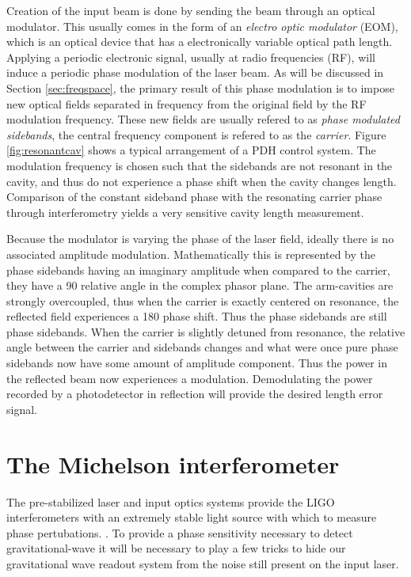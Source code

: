 Creation of the input beam is done by sending the beam through an optical modulator. %
This usually comes in the form of an \emph{electro optic modulator} (EOM), which is an optical device that has a electronically variable optical path length. %
Applying a periodic electronic signal, usually at radio frequencies (RF), will induce a periodic phase modulation of the laser beam. %
As will be discussed in Section \ref{sec:freqspace}, the primary result of this phase modulation is to impose new optical fields separated in frequency from the original field by the RF modulation frequency. %
These new fields are usually refered to as \emph{phase modulated sidebands}, the central frequency component is refered to as the \emph{carrier}. %
Figure \ref{fig:resonantcav} shows a typical arrangement of a PDH control system. %
The modulation frequency is chosen such that the sidebands are not resonant in the cavity, and thus do not experience a phase shift when the cavity changes length. %
Comparison of the constant sideband phase with the resonating carrier phase through interferometry yields a very sensitive cavity length measurement. %


Because the modulator is varying the phase of the laser field, ideally there is no associated amplitude modulation. %
Mathematically this is represented by the phase sidebands having an imaginary amplitude when compared to the carrier, they have a 90\degrees{} relative angle in the complex phasor plane. %
The arm-cavities are strongly overcoupled, thus when the carrier is exactly centered on resonance, the reflected field experiences a 180\degrees{} phase shift. %
Thus the phase sidebands are still phase sidebands. %
When the carrier is slightly detuned from resonance, the relative angle between the carrier and sidebands changes and what were once pure phase sidebands now have some amount of amplitude component. %
Thus the power in the reflected beam now experiences a modulation. %
Demodulating the power recorded by a photodetector in reflection will provide the desired length error signal.

\section{The Michelson interferometer}
The pre-stabilized laser and input optics systems provide the LIGO interferometers with an extremely stable light source with which to measure phase pertubations. %
. %
To provide a phase sensitivity necessary to detect gravitational-wave it will be necessary to play a few tricks to hide our gravitational wave readout system from the noise still present on the input laser.

